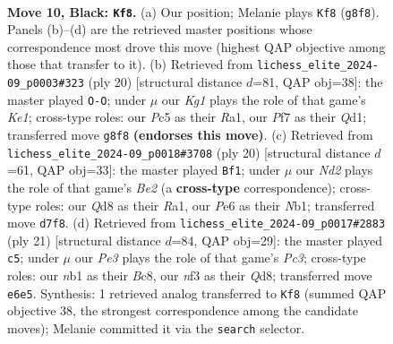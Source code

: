 \documentclass[11pt]{article}
\begin{document}
\clearpage

\begin{figure}[p]\centering
\begin{subfigure}{0.46\textwidth}\centering
\resizebox{\linewidth}{!}{%
\newchessgame
\chessboard[
  setfen={rnbqr1k1/pp1nbppp/4p3/2p5/2Pp2P1/1P3N1B/P2PPP1P/RNBQ1RK1 b - - 2 10},
  showmover=false,
  pgfstyle=straightmove, color=movearrow, markmove={g8-f8}
]}
\caption{}
\end{subfigure}\hfill
\begin{subfigure}{0.46\textwidth}\centering
\resizebox{\linewidth}{!}{%
\newchessgame
\chessboard[
  setfen={rn1q1rk1/1b1pppbp/p4np1/8/Pp1PP3/3BBP1N/1P1N2PP/R2QK2R w KQ - 4 11},
  showmover=false,
  pgfstyle=straightmove, color=movearrow, markmove={e1-g1}
]}
\caption{}
\end{subfigure}
\\[4pt]
\begin{subfigure}{0.46\textwidth}\centering
\resizebox{\linewidth}{!}{%
\newchessgame
\chessboard[
  setfen={r1bq1r1k/ppp3bp/2n2pp1/3np3/8/2PP1N2/PP2BPPP/RNBQR1K1 w - - 2 11},
  showmover=false,
  pgfstyle=straightmove, color=movearrow, markmove={e2-f1}
]}
\caption{}
\end{subfigure}\hfill
\begin{subfigure}{0.46\textwidth}\centering
\resizebox{\linewidth}{!}{%
\newchessgame
\chessboard[
  setfen={r1bq1rk1/p2nbppp/2p1pn2/P7/1pBP4/4PN2/1P3PPP/RNBQ1RK1 b - - 0 11},
  showmover=false,
  pgfstyle=straightmove, color=movearrow, markmove={c6-c5}
]}
\caption{}
\end{subfigure}
\caption{\textbf{Move 10, Black: \texttt{Kf8}.} (a) Our position; Melanie plays \texttt{Kf8} (\texttt{g8f8}). Panels (b)--(d) are the retrieved master positions whose correspondence most drove this move (highest QAP objective among those that transfer to it). (b) Retrieved from \texttt{lichess\_elite\_2024-09\_p0003\#323} (ply 20) [structural distance $d$=81, QAP obj=38]: the master played \texttt{O-O}; under $\mu$ our \emph{Kg1} plays the role of that game's \emph{Ke1}; cross-type roles: our \emph{P}c5 as their \emph{R}a1, our \emph{P}f7 as their \emph{Q}d1; transferred move \texttt{g8f8} \textbf{(endorses this move)}. (c) Retrieved from \texttt{lichess\_elite\_2024-09\_p0018\#3708} (ply 20) [structural distance $d$=61, QAP obj=33]: the master played \texttt{Bf1}; under $\mu$ our \emph{Nd2} plays the role of that game's \emph{Be2} (a \textbf{cross-type} correspondence); cross-type roles: our \emph{Q}d8 as their \emph{R}a1, our \emph{P}e6 as their \emph{N}b1; transferred move \texttt{d7f8}. (d) Retrieved from \texttt{lichess\_elite\_2024-09\_p0017\#2883} (ply 21) [structural distance $d$=84, QAP obj=29]: the master played \texttt{c5}; under $\mu$ our \emph{Pe3} plays the role of that game's \emph{Pc3}; cross-type roles: our \emph{n}b1 as their \emph{B}c8, our \emph{n}f3 as their \emph{Q}d8; transferred move \texttt{e6e5}. Synthesis: 1 retrieved analog transferred to \texttt{Kf8} (summed QAP objective 38, the strongest correspondence among the candidate moves); Melanie committed it via the \texttt{search} selector.}
\label{fig:thought-m19}
\end{figure}
\end{document}
